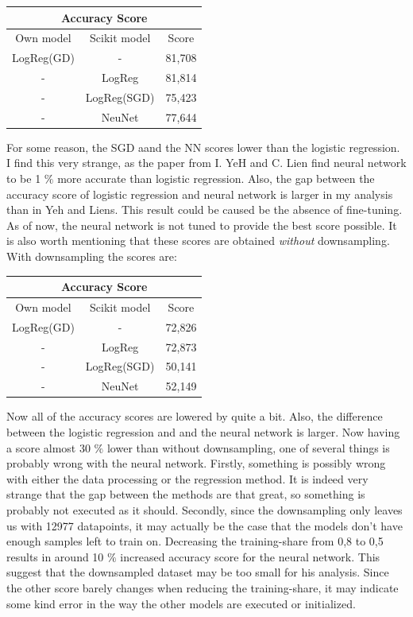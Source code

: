 \documentclass[a4paper,11pt,twocolumn]{article}
\begin{document}
\begin{center}
{ 
 \begin{tabular}{||c c c||} 
 \hline
 \multicolumn{3}{|c|}{Accuracy Score} \\
 \hline
 Own model & Scikit model & Score \\ [0.5ex] 
 \hline\hline
 LogReg(GD) & - & 81,708 \\ 
 \hline
 - & LogReg & 81,814 \\
 \hline
 - & LogReg(SGD) & 75,423  \\
 \hline
 - & NeuNet & 77,644 \\
 \hline
\end{tabular}
}
\end{center}

For some reason, the SGD aand the NN scores lower than the logistic regression. I find this very strange, as the paper from I. YeH and C. Lien \cite{data} find neural network to be 1 $\%$ more accurate than logistic regression. Also, the gap between the accuracy score of logistic regression and neural network is larger in my analysis than in Yeh and Liens. This result could be caused be the absence of fine-tuning. As of now, the neural network is not tuned to provide the best score possible. It is also worth mentioning that these scores are obtained \textit{without} downsampling. With downsampling the scores are:

\begin{center}
{ 
 \begin{tabular}{||c c c||} 
 \hline
 \multicolumn{3}{|c|}{Accuracy Score} \\
 \hline
 Own model & Scikit model & Score \\ [0.5ex] \hline
 \hline
 LogReg(GD) & - & 72,826 \\ 
 \hline
 - & LogReg & 72,873 \\
 \hline
 - & LogReg(SGD) & 50,141  \\
 \hline
 - & NeuNet & 52,149 \\
 \hline
\end{tabular}
}
\end{center}

Now all of the accuracy scores are lowered by quite a bit. Also, the difference between the logistic regression and  and the neural network is larger. Now having a score almost 30 $\%$ lower than without downsampling, one of several things is probably wrong with the neural network. Firstly, something is possibly wrong with either the data processing or the regression method. It is indeed very strange that the gap between the methods are that great, so something is probably not executed as it should. Secondly, since the downsampling only leaves us with 12977 datapoints, it may actually be the case that the models don't have enough samples left to train on. Decreasing the training-share from 0,8 to 0,5 results in around 10 $\%$ increased accuracy score for the neural network. This suggest that the downsampled dataset may be too small for his analysis. Since the other score barely changes when reducing the training-share, it may indicate some kind error in the way the other models are executed or initialized.         
\end{document}
